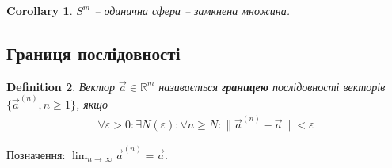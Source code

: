 \documentclass[a4paper, 10pt]{article}
\makeatletter
\def\huge{\displaystyle}
\def\qed{$\blacksquare$}
\theoremstyle{theoremdd}
\newtheorem{theorem}{Theorem}[subsection]
\theoremstyle{theoremdd}
\theoremstyle{theoremdd}
\newtheorem{definition}[theorem]{Definition}
\theoremstyle{theoremdd}
\theoremstyle{theoremdd}
\theoremstyle{theoremdd}
\theoremstyle{theoremdd}
\theoremstyle{theoremdd}
\theoremstyle{theoremdd}
\newtheorem{corollary}[theorem]{Corollary}
\renewenvironment{proof}[1][Proof.\\]{\par
\pushQED{\hfill \qed}%
\normalfont \topsep6\p@\@plus6\p@\relax
\trivlist
\item\relax
{\bfseries
#1\@addpunct{.}}\hspace\labelsep\ignorespaces
}{%
\popQED\endtrivlist\@endpefalse
}
\newcommand\Norm[1]{\|#1\|}
\makeatother
\begin{document}
\begin{corollary}
$S^m$ -- одинична сфера -- замкнена множина.
\end{corollary}

\iffalse
\begin{theorem}[Лема Кантора про вкладеність]
Задамо прямокутники $\Pi_n = [a_n,b_n] \times [c_n,d_n]$, які є вкладеними, тобто $\Pi_1 \supset \Pi_2 \supset \dots$. Тоді:\\
1) $\exists \vec{c} \in \mathbb{R}^2: \forall n \geq 1: \vec{c} \in \Pi_n$\\
2) Якщо додатково $\text{diam } \Pi_n \to 0, n \to \infty$, то тоді така точка - єдина. $\text{diam } A =\huge \sup_{\vec{x},\vec{y} \in A} \lVert \vec{x}-\vec{y} \rVert$
\end{theorem}

\begin{proof}
Зауважимо, що $\Pi_{n+1} \subset \Pi_n \iff \begin{cases} [a_{n+1},b_{n+1}] \subset [a_n,b_n] \\ [c_{n+1},d_{n+1}] \subset [c_n,d_n] \end{cases}$. Доводиться простенько.\\
Тоді ми маємо систему з вкладених відрізків. Тоді за лемою Кантора в матані $\mathbb{R}$, маємо, що:\\
$\exists \alpha \in \mathbb{R}: \forall n \geq 1: \alpha \in [a_n,b_n]$ та $\exists \beta \in \mathbb{R}: \forall n \geq 1: \beta \in [c_n,d_n]$. Встановимо $\vec{c} = \begin{pmatrix}
\alpha \\ \beta
\end{pmatrix}$. Тоді за декартовим добутком, $\forall n \geq 1: \vec{c} \in \Pi_n$.\\
Тепер нехай $\text{diam } \Pi_n \to 0, n \to \infty$. Тоді це означає, що $\huge \sup_{\vec{x},\vec{y} \in \Pi_n} \lVert \vec{x}-\vec{y} \rVert \to 0 \implies \\ \forall \varepsilon > 0: \exists N: \forall n \geq N: \forall \vec{x},\vec{y} \in \Pi_n: \lVert \vec{x}-\vec{y} \rVert < \varepsilon \implies \begin{cases} |x_1-y_1| < \varepsilon \\ |x_2-y_2| < \varepsilon \end{cases}$.
\end{proof}
\fi

\subsection{Границя послідовності}
\begin{definition}
Вектор $\vec{a} \in \mathbb{R}^m$ називається \textbf{границею} послідовності векторів $\{\vec{a}^{(n)}, n \geq 1 \}$, якщо
\begin{align*}
\forall \varepsilon > 0: \exists N(\varepsilon): \forall n \geq N: \Norm{\vec{a}^{(n)} - \vec{a}} < \varepsilon
\end{align*}
\end{definition}
Позначення: $\huge \lim_{n \to \infty} \vec{a}^{(n)} = \vec{a}$.
\end{document}
